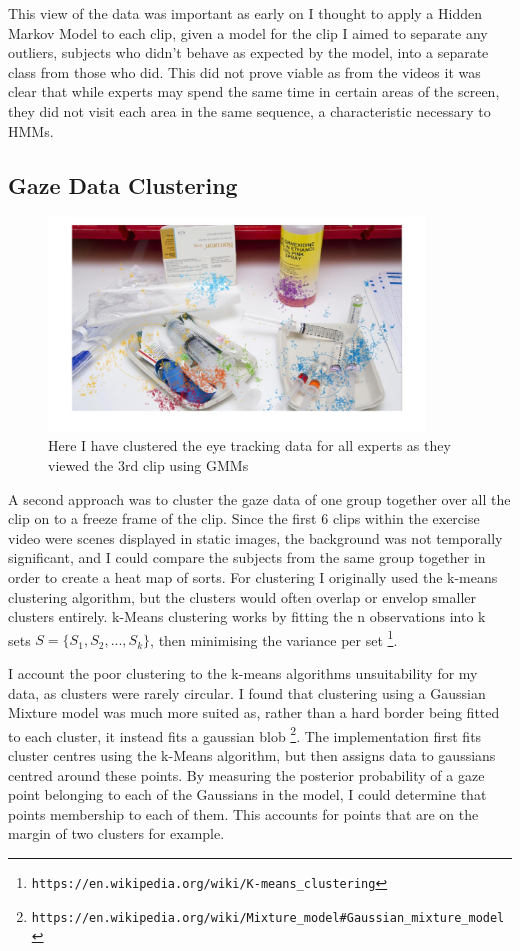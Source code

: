 \documentclass{report}
\begin{document}
{				This view of the data was important as early on I thought to apply a Hidden Markov Model to each clip, given a model for the clip I aimed to separate any outliers, subjects who didn't behave as expected by the model, into a separate class from those who did. This did not prove viable as from the videos it was clear that while experts may spend the same time in certain areas of the screen, they did not visit each area in the same sequence, a characteristic necessary to HMMs.
			\subsection{Gaze Data Clustering}
				\begin{figure}[h]
					\includegraphics[width=10cm]{expertcluster}
					\centering
					\caption{Here I have clustered the eye tracking data for all experts as they viewed the 3rd clip using GMMs}
				\end{figure}
				A second approach was to cluster the gaze data of one group together over all the clip on to a freeze frame of the clip. Since the first 6 clips within the exercise video were scenes displayed in static images, the background was not temporally significant, and I could compare the subjects from the same group together in order to create a heat map of sorts. For clustering I originally used the k-means clustering algorithm, but the clusters would often overlap or envelop smaller clusters entirely. k-Means clustering works by fitting the n observations into k sets \(S = \{S_{1},S_{2}, ..., S_{k}\}\), then minimising the variance per set \footnote[1]{\texttt{https://en.wikipedia.org/wiki/K-means\_clustering}}.
				
				I account the poor clustering to the k-means algorithms unsuitability for my data, as clusters were rarely circular. I found that clustering using a Gaussian Mixture model was much more suited as, rather than a hard border being fitted to each cluster, it instead fits a gaussian blob \footnote[2]{\texttt{https://en.wikipedia.org/wiki/Mixture\_model\#Gaussian\_mixture\_model}}. The implementation first fits cluster centres using the k-Means algorithm, but then assigns data to gaussians centred around these points. By measuring the posterior probability of a gaze point belonging to each of the Gaussians in the model, I could determine that points membership to each of them. This accounts for points that are on the margin of two clusters for example.
				
}
\end{document}
